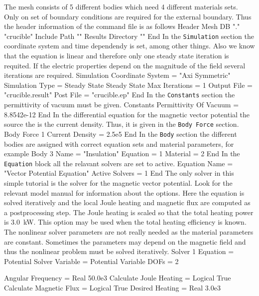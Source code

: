 The mesh consists of 5 different bodies which need 4
different materials sets. Only on set of boundary conditions 
are required for the external boundary. Thus the header 
information of the command file is as follows
\ttbegin
Header
  Mesh DB "." "crucible"
  Include Path ""
  Results Directory ""
End
\ttend
%
In the \texttt{Simulation} section the coordinate system and
time dependendy is set, among other things. Also we know that
the equation is linear and therefore only one steady state
iteration is requited. If the electric properties depend on 
the magnitude of the field several iterations are required.
\ttbegin
Simulation
  Coordinate System = "Axi Symmetric"
  Simulation Type = Steady State
  Steady State Max Iterations = 1
  Output File = "crucible.result"
  Post File = "crucible.ep"
End
\ttend
%
In the \texttt{Constants} section the permittivity of 
vacuum must be given.
\ttbegin
Constants
  Permittivity Of Vacuum = 8.8542e-12
End
\ttend
%
In the differential equation for the magnetic vector potential the 
source the is the current density. Thus, it is given in the
\texttt{Body Force} section. 
\ttbegin
Body Force 1
  Current Density = 2.5e5
End
\ttend
%
In the \texttt{Body} section the different bodies are assigned 
with correct equation sets and material parameters, for example
\ttbegin
Body 3
  Name = "Insulation"
  Equation = 1
  Material = 2
End
\ttend
%
In the \texttt{Equation} block all the relavant solvers are 
set to active.
\ttbegin
Equation
  Name = "Vector Potential Equation"
  Active Solvers = 1
End
\ttend
%
The only solver in this simple tutorial is the solver for the magnetic
vector potential. Look for the relevant model manual for information
about the options. Here the equation is solved iteratively and the
local Joule heating and magnetic flux are computed as a postprocessing
step. The Joule heating is scaled so that the total heating power is
3.0~kW. This option may be used when the total heating efficiency is
known.  The nonlinear solver parameters are not really needed as the
material parameters are constant. Sometimes the parameters may depend
on the magnetic field and thus the nonlinear problem must be solved
iteratively.
%
\ttbegin
Solver 1
  Equation = Potential Solver
  Variable = Potential
  Variable DOFs = 2

  Angular Frequency = Real 50.0e3
  Calculate Joule Heating = Logical True
  Calculate Magnetic Flux = Logical True
  Desired Heating = Real 3.0e3

